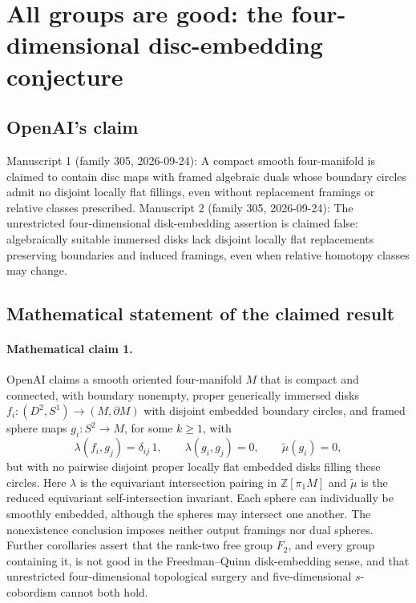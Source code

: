 \documentclass[11pt]{article}
\begin{document}
\section*{All groups are good: the four-dimensional disc-embedding conjecture}

\subsection{OpenAI's claim}
Manuscript 1 (family 305, 2026-09-24): A compact smooth four-manifold is claimed to contain disc maps with framed algebraic duals whose boundary circles admit no disjoint locally flat fillings, even without replacement framings or relative classes prescribed. Manuscript 2 (family 305, 2026-09-24): The unrestricted four-dimensional disk-embedding assertion is claimed false: algebraically suitable immersed disks lack disjoint locally flat replacements preserving boundaries and induced framings, even when relative homotopy classes may change.

\subsection{Mathematical statement of the claimed result}
\paragraph{Mathematical claim 1.} OpenAI claims a smooth oriented four-manifold $M$ that is compact and connected, with boundary nonempty, proper generically immersed disks $f_i:(D^2,S^1)\to(M,\partial M)$ with disjoint embedded boundary circles, and framed sphere maps $g_i:S^2\to M$, for some $k\ge1$, with
\[
\lambda(f_i,g_j)=\delta_{ij}\,1,\qquad\lambda(g_i,g_j)=0,\qquad\widetilde\mu(g_i)=0,
\]
but with no pairwise disjoint proper locally flat embedded disks filling these circles. Here $\lambda$ is the equivariant intersection pairing in $\mathbb Z[\pi_1M]$ and $\widetilde\mu$ is the reduced equivariant self-intersection invariant. Each sphere can individually be smoothly embedded, although the spheres may intersect one another. The nonexistence conclusion imposes neither output framings nor dual spheres. Further corollaries assert that the rank-two free group $F_2$, and every group containing it, is not good in the Freedman--Quinn disk-embedding sense, and that unrestricted four-dimensional topological surgery and five-dimensional $s$-cobordism cannot both hold.
\end{document}

